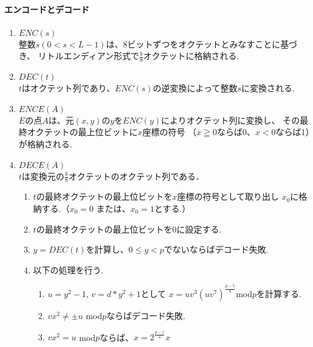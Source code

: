 \paragraph{エンコードとデコード}
\begin{enumerate}
  \item $ENC(s)$\\
  整数$s (0<s<L-1)$は、8ビットずつをオクテットとみなすことに基づき、
  リトルエンディアン形式で$\tfrac{b}{8}$オクテットに格納される.
  \item $DEC(t)$\\
  $t$はオクテット列であり、$ENC(s)$の逆変換によって整数$s$に変換される.
  \item $ENCE(A)$\\
  $E$の点$A$は、元$(x,y)$の$y$を$ENC(y)$によりオクテット列に変換し、
  その最終オクテットの最上位ビットに$x$座標の符号
  （$x≧0$ならば0、$x<0$ならば1）が格納される.
  \item $DECE(A)$\\
  $t$は変換元の$\tfrac{b}{8}$オクテットのオクテット列である．
  \begin{enumerate}
    \item $t$の最終オクテットの最上位ビットを$x$座標の符号として取り出し
    $x_0$に格納する.（$x_0=0$ または、$x_0=1$とする.）
    \item $t$の最終オクテットの最上位ビットを0に設定する.
    \item $y=DEC(t)$を計算し、$0\leq y<p$でないならばデコード失敗.
    \item 以下の処理を行う.
    \begin{enumerate}
      \item $u=y^2-1$, $v=d*y^2+1$として
      $x=uv^3(uv^7)^{\tfrac{p-5}{8}}$mod$p$を計算する.
      \item $vx^2 \neq \pm  u$ mod$p$ならばデコード失敗.
      \item $vx^2=u$ mod$p$ならば、$x=2^{\tfrac{p-1}{4}}x$
    \end{enumerate}
  \end{enumerate}
\end{enumerate}

